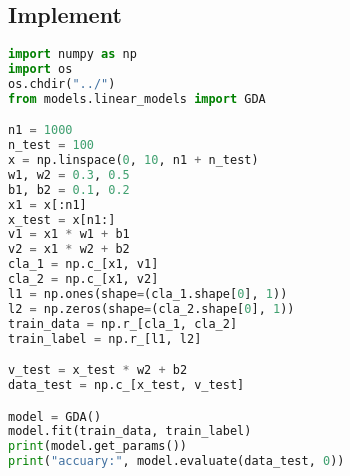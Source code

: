 \documentclass{report}
\begin{document}
\subsection{Implement}
\begin{lstlisting}[language={python}]
import numpy as np
import os
os.chdir("../")
from models.linear_models import GDA

n1 = 1000
n_test = 100
x = np.linspace(0, 10, n1 + n_test)
w1, w2 = 0.3, 0.5
b1, b2 = 0.1, 0.2
x1 = x[:n1]
x_test = x[n1:]
v1 = x1 * w1 + b1
v2 = x1 * w2 + b2
cla_1 = np.c_[x1, v1]
cla_2 = np.c_[x1, v2]
l1 = np.ones(shape=(cla_1.shape[0], 1))
l2 = np.zeros(shape=(cla_2.shape[0], 1))
train_data = np.r_[cla_1, cla_2]
train_label = np.r_[l1, l2]

v_test = x_test * w2 + b2
data_test = np.c_[x_test, v_test]

model = GDA()
model.fit(train_data, train_label)
print(model.get_params())
print("accuary:", model.evaluate(data_test, 0))
\end{lstlisting}
\end{document}
